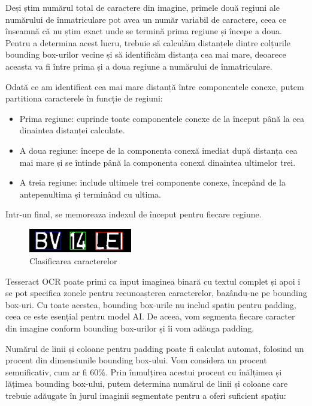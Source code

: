 \documentclass[a4paper,12pt]{report}
\begin{document}
Deși știm numărul total de caractere din imagine, primele două regiuni ale numărului de înmatriculare pot avea un număr variabil de caractere, ceea ce înseamnă că nu știm exact unde se termină prima regiune și începe a doua. Pentru a determina acest lucru, trebuie să calculăm distanțele dintre colțurile bounding box-urilor vecine și să identificăm distanța cea mai mare, deoarece aceasta va fi între prima și a doua regiune a numărului de înmatriculare.

Odată ce am identificat cea mai mare distanță între componentele conexe, putem partitiona caracterele în funcție de regiuni:

\begin{itemize}[itemsep=5pt, parsep=0pt]
    \item Prima regiune: cuprinde toate componentele conexe de la început până la cea dinaintea distanței calculate.
    \item A doua regiune: începe de la componenta conexă imediat după distanța cea mai mare și se întinde până la componenta conexă dinaintea ultimelor trei.
    \item A treia regiune: include ultimele trei componente conexe, începând de la antepenultima și terminând cu ultima.
\end{itemize}

Intr-un final, se memoreaza indexul de început pentru fiecare regiune.

\begin{figure}[h]
    \centering
    \includegraphics[width=0.4\textwidth]{images/partitioned.jpg}
    \caption{Clasificarea caracterelor}
\end{figure}
\FloatBarrier

Tesseract OCR poate primi ca input imaginea binară cu textul complet și apoi i se pot specifica zonele pentru recunoașterea caracterelor, bazându-ne pe bounding box-uri. Cu toate acestea, bounding box-urile nu includ spațiu pentru padding, ceea ce este esențial pentru model AI. De aceea, vom segmenta fiecare caracter din imagine conform bounding box-urilor și îi vom adăuga padding.

Numărul de linii și coloane pentru padding poate fi calculat automat, folosind un procent din dimensiunile bounding box-ului. Vom considera un procent semnificativ, cum ar fi 60\%. Prin înmulțirea acestui procent cu înălțimea și lățimea bounding box-ului, putem determina numărul de linii și coloane care trebuie adăugate în jurul imaginii segmentate pentru a oferi suficient spațiu:
\end{document}
